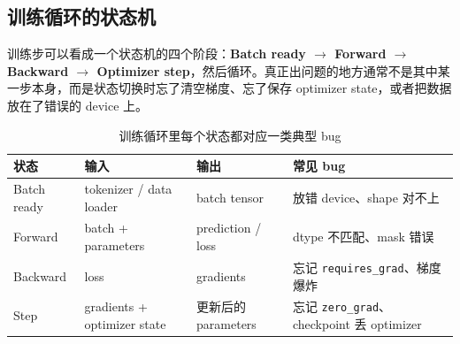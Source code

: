 \subsection{训练循环的状态机}

训练步可以看成一个状态机的四个阶段：\textbf{Batch ready $\to$ Forward $\to$ Backward $\to$ Optimizer step}，然后循环。真正出问题的地方通常不是其中某一步本身，而是状态切换时忘了清空梯度、忘了保存 optimizer state，或者把数据放在了错误的 device 上。

\begin{table}[H]
\centering
\begin{tabular}{p{}p{}p{}p{}}
\toprule
\textbf{状态} & \textbf{输入} & \textbf{输出} & \textbf{常见 bug} \\
\midrule
Batch ready & tokenizer / data loader & batch tensor & 放错 device、shape 对不上 \\
Forward & batch + parameters & prediction / loss & dtype 不匹配、mask 错误 \\
    Backward & loss & gradients & 忘记 \texttt{requires\_grad}、梯度爆炸 \\
    Step & gradients + optimizer state & 更新后的 parameters & 忘记 \texttt{zero\_grad}、checkpoint 丢 optimizer \\
\bottomrule
\end{tabular}
\caption{训练循环里每个状态都对应一类典型 bug}
\end{table}

